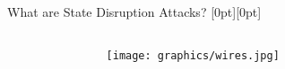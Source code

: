 \begin{frame}{What are State Disruption Attacks?}
  \raisebox{0pt}[0pt][0pt]{
    \begin{minipage}{\textwidth}
      \vspace{2.2cm}
      \begin{columns}[T,fullwidth]
        \begin{column}{.325\linewidth}
        \end{column}
        \begin{column}{.35\linewidth}
          \centering
          \texttt{[image: graphics/wires.jpg]}
        \end{column}
        \begin{column}{.325\linewidth}

\end{column}
\end{columns}
\end{minipage}}
\end{frame}
